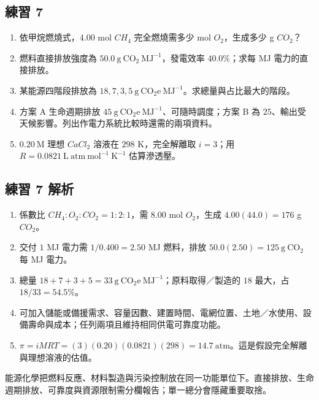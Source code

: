 \documentclass[11pt,a4paper]{article}
\providecommand{\tightlist}{%
  \setlength{\itemsep}{0pt}\setlength{\parskip}{0pt}}
\begin{document}
\subsection{練習 7}\label{ux7df4ux7fd2-7}

\begin{enumerate}
\def\labelenumi{\arabic{enumi}.}
\tightlist
\item
  依甲烷燃燒式，\(4.00\) mol \(CH_4\) 完全燃燒需多少 mol \(O_2\)，生成多少 g \(CO_2\)？
\item
  燃料直接排放強度為 \(50.0\ \mathrm{g\ CO_2\ MJ^{-1}}\)，發電效率 \(40.0\%\)；求每 MJ 電力的直接排放。
\item
  某能源四階段排放為 \(18,7,3,5\ \mathrm{g\ CO_2e\ MJ^{-1}}\)。求總量與占比最大的階段。
\item
  方案 A 生命週期排放 \(45\ \mathrm{g\ CO_2e\ MJ^{-1}}\)、可隨時調度；方案 B 為 \(25\)、輸出受天候影響。列出作電力系統比較時還需的兩項資料。
\item
  \(0.20\ \mathrm M\) 理想 \(CaCl_2\) 溶液在 \(298\) K，完全解離取 \(i=3\)；用 \(R=0.0821\ \mathrm{L\ atm\ mol^{-1}\ K^{-1}}\) 估算滲透壓。
\end{enumerate}

\subsection{練習 7 解析}\label{ux7df4ux7fd2-7-ux89e3ux6790}

\begin{enumerate}
\def\labelenumi{\arabic{enumi}.}
\tightlist
\item
  係數比 \(CH_4:O_2:CO_2=1:2:1\)，需 \(8.00\) mol \(O_2\)，生成 \(4.00(44.0)=176\) g \(CO_2\)。
\item
  交付 \(1\) MJ 電力需 \(1/0.400=2.50\) MJ 燃料，排放 \(50.0(2.50)=125\ \mathrm{g\ CO_2}\) 每 MJ 電力。
\item
  總量 \(18+7+3+5=33\ \mathrm{g\ CO_2e\ MJ^{-1}}\)；原料取得／製造的 \(18\) 最大，占 \(18/33=54.5\%\)。
\item
  可加入儲能或備援需求、容量因數、建置時間、電網位置、土地／水使用、設備壽命與成本；任列兩項且維持相同供電可靠度功能。
\item
  \(\pi=iMRT=(3)(0.20)(0.0821)(298)=14.7\ \mathrm{atm}\)。這是假設完全解離與理想溶液的估值。
\end{enumerate}

能源化學把燃料反應、材料製造與污染控制放在同一功能單位下。直接排放、生命週期排放、可靠度與資源限制需分欄報告；單一總分會隱藏重要取捨。
\end{document}
